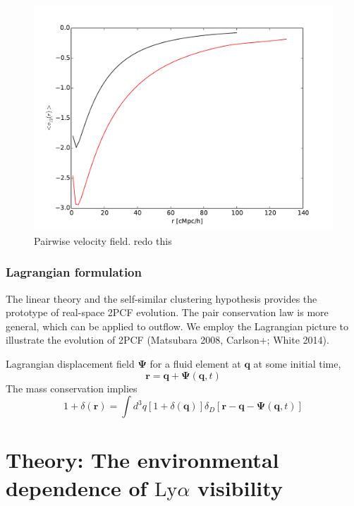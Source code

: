 \documentclass[useAMS,usenatbib,twocolumn]{mn2e}
\newcommand{\LyA}{\mbox{Ly}\alpha}
\begin{document}
\begin{figure}
 \begin{center}
  \includegraphics[angle=0,width=\columnwidth]{figure/v12.pdf}
  \caption{Pairwise velocity field. redo this}
 \end{center}
\end{figure}

\subsubsection{Lagrangian formulation}
The linear theory and the self-similar clustering hypothesis provides
the prototype of real-space 2PCF evolution. The pair conservation law is
more general, which can be applied to outflow. We employ the Lagrangian
picture to illustrate the evolution of 2PCF (Matsubara 2008, Carlson+;
White 2014). 

Lagrangian displacement field $\boldsymbol{\Psi}$ for a fluid element
at $\boldsymbol{q}$ at some initial time,
\begin{equation}
\boldsymbol{r}=\boldsymbol{q}+\boldsymbol{\Psi}(\boldsymbol{q},t)
\end{equation}
The mass conservation implies
\begin{equation}
1+\delta(\boldsymbol{r})=\int d^3q[1+\delta(\boldsymbol{q})]
\delta_D[\boldsymbol{r}-\boldsymbol{q}-\boldsymbol{\Psi}(\boldsymbol{q},t)]
\end{equation}


\section{Theory: The environmental dependence of $\LyA$ visibility}
\end{document}

